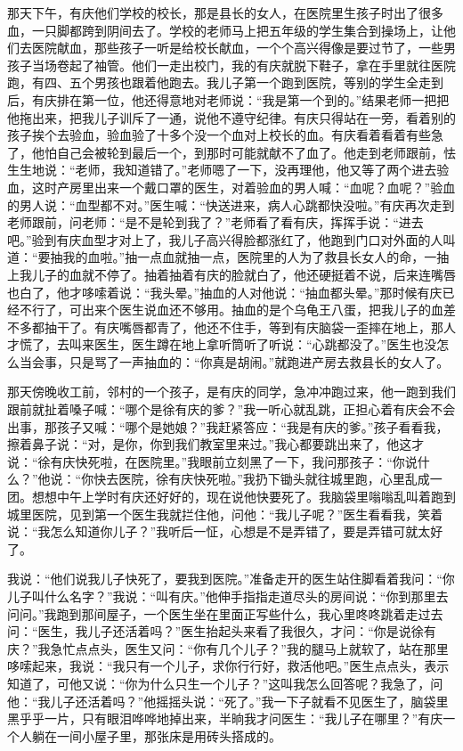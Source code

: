 \documentclass[12pt,UTF8]{ctexbook}
\begin{document}
那天下午，有庆他们学校的校长，那是县长的女人，在医院里生孩子时出了很多血，一只脚都跨到阴间去了。学校的老师马上把五年级的学生集合到操场上，让他们去医院献血，那些孩子一听是给校长献血，一个个高兴得像是要过节了，一些男孩子当场卷起了袖管。他们一走出校门，我的有庆就脱下鞋子，拿在手里就往医院跑，有四、五个男孩也跟着他跑去。我儿子第一个跑到医院，等别的学生全走到后，有庆排在第一位，他还得意地对老师说：“我是第一个到的。”结果老师一把把他拖出来，把我儿子训斥了一通，说他不遵守纪律。有庆只得站在一旁，看着别的孩子挨个去验血，验血验了十多个没一个血对上校长的血。有庆看着看着有些急了，他怕自己会被轮到最后一个，到那时可能就献不了血了。他走到老师跟前，怯生生地说：“老师，我知道错了。”老师嗯了一下，没再理他，他又等了两个进去验血，这时产房里出来一个戴口罩的医生，对着验血的男人喊：“血呢？血呢？”验血的男人说：“血型都不对。”医生喊：“快送进来，病人心跳都快没啦。”有庆再次走到老师跟前，问老师：“是不是轮到我了？”老师看了看有庆，挥挥手说：“进去吧。”验到有庆血型才对上了，我儿子高兴得脸都涨红了，他跑到门口对外面的人叫道：“要抽我的血啦。”抽一点血就抽一点，医院里的人为了救县长女人的命，一抽上我儿子的血就不停了。抽着抽着有庆的脸就白了，他还硬挺着不说，后来连嘴唇也白了，他才哆嗦着说：“我头晕。”抽血的人对他说：“抽血都头晕。”那时候有庆已经不行了，可出来个医生说血还不够用。抽血的是个乌龟王八蛋，把我儿子的血差不多都抽干了。有庆嘴唇都青了，他还不住手，等到有庆脑袋一歪摔在地上，那人才慌了，去叫来医生，医生蹲在地上拿听筒听了听说：“心跳都没了。”医生也没怎么当会事，只是骂了一声抽血的：“你真是胡闹。”就跑进产房去救县长的女人了。

那天傍晚收工前，邻村的一个孩子，是有庆的同学，急冲冲跑过来，他一跑到我们跟前就扯着嗓子喊：“哪个是徐有庆的爹？”我一听心就乱跳，正担心着有庆会不会出事，那孩子又喊：“哪个是她娘？”我赶紧答应：“我是有庆的爹。”孩子看看我，擦着鼻子说：“对，是你，你到我们教室里来过。”我心都要跳出来了，他这才说：“徐有庆快死啦，在医院里。”我眼前立刻黑了一下，我问那孩子：“你说什么？”他说：“你快去医院，徐有庆快死啦。”我扔下锄头就往城里跑，心里乱成一团。想想中午上学时有庆还好好的，现在说他快要死了。我脑袋里嗡嗡乱叫着跑到城里医院，见到第一个医生我就拦住他，问他：“我儿子呢？”医生看看我，笑着说：“我怎么知道你儿子？”我听后一怔，心想是不是弄错了，要是弄错可就太好了。

我说：“他们说我儿子快死了，要我到医院。”准备走开的医生站住脚看着我问：“你儿子叫什么名字？”我说：“叫有庆。”他伸手指指走道尽头的房间说：“你到那里去问问。”我跑到那间屋子，一个医生坐在里面正写些什么，我心里咚咚跳着走过去问：“医生，我儿子还活着吗？”医生抬起头来看了我很久，才问：“你是说徐有庆？”我急忙点点头，医生又问：“你有几个儿子？”我的腿马上就软了，站在那里哆嗦起来，我说：“我只有一个儿子，求你行行好，救活他吧。”医生点点头，表示知道了，可他又说：“你为什么只生一个儿子？”这叫我怎么回答呢？我急了，问他：“我儿子还活着吗？”他摇摇头说：“死了。”我一下子就看不见医生了，脑袋里黑乎乎一片，只有眼泪哗哗地掉出来，半晌我才问医生：“我儿子在哪里？”有庆一个人躺在一间小屋子里，那张床是用砖头搭成的。
\end{document}
